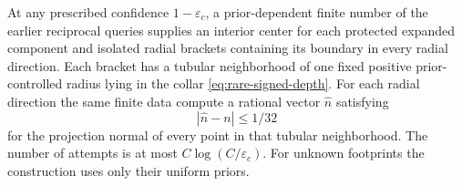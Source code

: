\begin{lemma}
\label{lem:rare-coarse-normals}
At any prescribed confidence $1-\varepsilon_c$, a prior-dependent
finite number of the earlier reciprocal queries supplies an interior
center for each protected expanded component and isolated radial
brackets containing its boundary in every radial direction. Each bracket
has a tubular neighborhood of one fixed positive prior-controlled radius
lying in the collar \eqref{eq:rare-signed-depth}. For each radial
direction the same finite data compute a rational vector $\widehat n$
satisfying
\begin{equation}\label{eq:rare-normal-error}
                         |\widehat n-n|\le1/32
\end{equation}
for the projection normal of every point in that tubular neighborhood.
The number
of attempts is at most $C\log(C/\varepsilon_c)$. For unknown
footprints the construction uses only their uniform priors.
\end{lemma}
